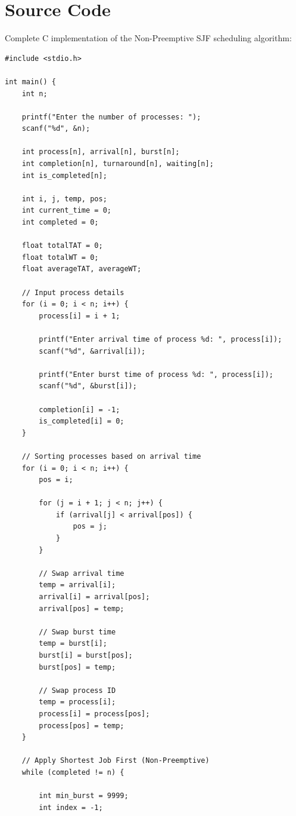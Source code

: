 \documentclass[10pt,a4paper]{article}
\begin{document}
\section{Source Code}
Complete C implementation of the Non-Preemptive SJF scheduling algorithm:

\begin{lstlisting}
#include <stdio.h>

int main() {
    int n;

    printf("Enter the number of processes: ");
    scanf("%d", &n);

    int process[n], arrival[n], burst[n];
    int completion[n], turnaround[n], waiting[n];
    int is_completed[n];

    int i, j, temp, pos;
    int current_time = 0;
    int completed = 0;

    float totalTAT = 0;
    float totalWT = 0;
    float averageTAT, averageWT;

    // Input process details
    for (i = 0; i < n; i++) {
        process[i] = i + 1;

        printf("Enter arrival time of process %d: ", process[i]);
        scanf("%d", &arrival[i]);

        printf("Enter burst time of process %d: ", process[i]);
        scanf("%d", &burst[i]);

        completion[i] = -1;
        is_completed[i] = 0;
    }

    // Sorting processes based on arrival time
    for (i = 0; i < n; i++) {
        pos = i;

        for (j = i + 1; j < n; j++) {
            if (arrival[j] < arrival[pos]) {
                pos = j;
            }
        }

        // Swap arrival time
        temp = arrival[i];
        arrival[i] = arrival[pos];
        arrival[pos] = temp;

        // Swap burst time
        temp = burst[i];
        burst[i] = burst[pos];
        burst[pos] = temp;

        // Swap process ID
        temp = process[i];
        process[i] = process[pos];
        process[pos] = temp;
    }

    // Apply Shortest Job First (Non-Preemptive)
    while (completed != n) {

        int min_burst = 9999;
        int index = -1;


\end{lstlisting}
\end{document}
